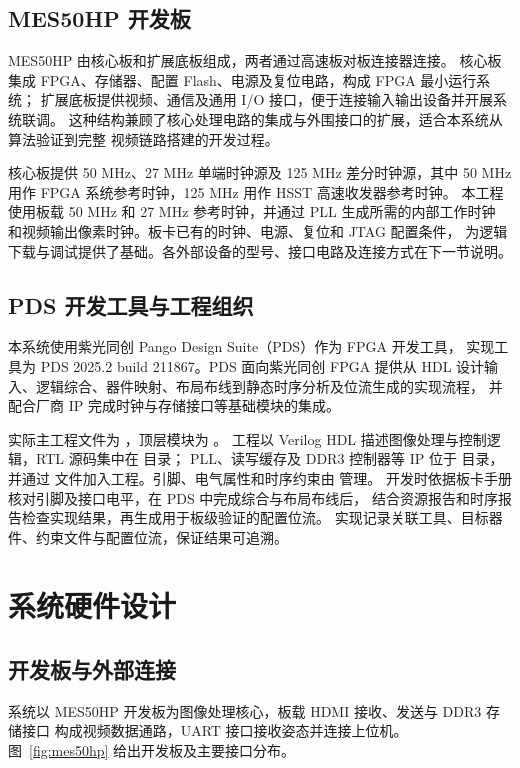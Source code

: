 \subsection{MES50HP 开发板}
MES50HP 由核心板和扩展底板组成，两者通过高速板对板连接器连接。
核心板集成 FPGA、存储器、配置 Flash、电源及复位电路，构成 FPGA 最小运行系统；
扩展底板提供视频、通信及通用 I/O 接口，便于连接输入输出设备并开展系统联调\cite{board}。
这种结构兼顾了核心处理电路的集成与外围接口的扩展，适合本系统从算法验证到完整
视频链路搭建的开发过程。

核心板提供 50 MHz、27 MHz 单端时钟源及 125 MHz 差分时钟源，其中
50 MHz 用作 FPGA 系统参考时钟，125 MHz 用作 HSST 高速收发器参考时钟。
本工程使用板载 50 MHz 和 27 MHz 参考时钟，并通过 PLL 生成所需的内部工作时钟
和视频输出像素时钟。板卡已有的时钟、电源、复位和 JTAG 配置条件，
为逻辑下载与调试提供了基础。各外部设备的型号、接口电路及连接方式在下一节说明。

\subsection{PDS 开发工具与工程组织}
本系统使用紫光同创 Pango Design Suite（PDS）作为 FPGA 开发工具，
实现工具为 PDS 2025.2 build 211867。PDS 面向紫光同创 FPGA 提供从
HDL 设计输入、逻辑综合、器件映射、布局布线到静态时序分析及位流生成的实现流程，
并配合厂商 IP 完成时钟与存储接口等基础模块的集成。

实际主工程文件为 ，顶层模块为 。
工程以 Verilog HDL 描述图像处理与控制逻辑，RTL 源码集中在  目录；
PLL、读写缓存及 DDR3 控制器等 IP 位于  目录，并通过
 文件加入工程。引脚、电气属性和时序约束由
 管理。
开发时依据板卡手册核对引脚及接口电平，在 PDS 中完成综合与布局布线后，
结合资源报告和时序报告检查实现结果，再生成用于板级验证的配置位流。
实现记录关联工具、目标器件、约束文件与配置位流，保证结果可追溯。

\section{系统硬件设计}
\subsection{开发板与外部连接}
系统以 MES50HP 开发板为图像处理核心，板载 HDMI 接收、发送与 DDR3 存储接口
构成视频数据通路，UART 接口接收姿态并连接上位机。
图~\ref{fig:mes50hp} 给出开发板及主要接口分布。

